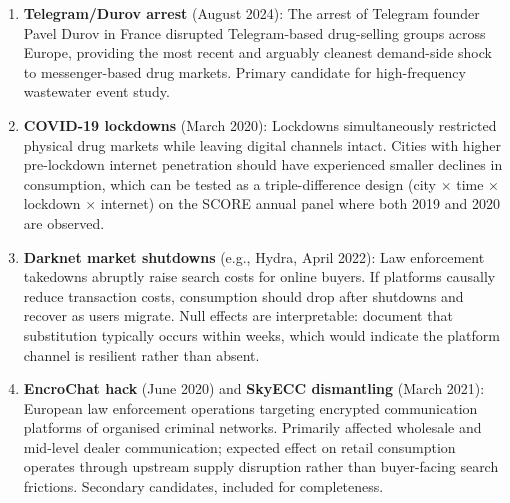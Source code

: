 \documentclass[12pt, a4paper]{article}
\begin{document}
\begin{enumerate}
    \item \textbf{Telegram/Durov arrest} (August 2024): The arrest of Telegram founder Pavel Durov in France disrupted Telegram-based drug-selling groups across Europe, providing the most recent and arguably cleanest demand-side shock to messenger-based drug markets. Primary candidate for high-frequency wastewater event study.
    
    \item \textbf{COVID-19 lockdowns} (March 2020): Lockdowns simultaneously restricted physical drug markets while leaving digital channels intact. Cities with higher pre-lockdown internet penetration should have experienced smaller declines in consumption, which can be tested as a triple-difference design (city $\times$ time $\times$ lockdown $\times$ internet) on the SCORE annual panel where both 2019 and 2020 are observed.
    
    \item \textbf{Darknet market shutdowns} (e.g., Hydra, April 2022): Law enforcement takedowns abruptly raise search costs for online buyers. If platforms causally reduce transaction costs, consumption should drop after shutdowns and recover as users migrate. Null effects are interpretable: \citet{soska_christin_2015} document that substitution typically occurs within weeks, which would indicate the platform channel is resilient rather than absent.
    
    \item \textbf{EncroChat hack} (June 2020) and \textbf{SkyECC dismantling} (March 2021): European law enforcement operations targeting encrypted communication platforms of organised criminal networks. Primarily affected wholesale and mid-level dealer communication; expected effect on retail consumption operates through upstream supply disruption rather than buyer-facing search frictions. Secondary candidates, included for completeness.
\end{enumerate}
\end{document}
